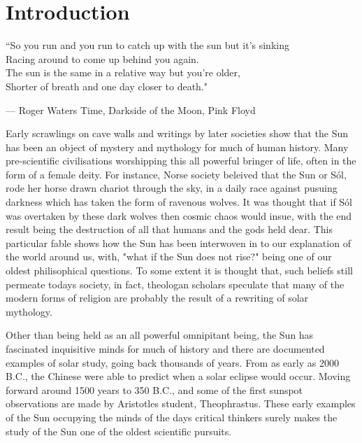 \section{Introduction}

\epigraphfontsize{\small\itshape}
\epigraph{``So you run and you run to catch up with the sun but it's sinking \\
Racing around to come up behind you again. \\
The sun is the same in a relative way but you're older, \\
Shorter of breath and one day closer to death."}{--- \textup{Roger Waters} Time, Darkside of the Moon, Pink Floyd}


Early scrawlings on cave walls and writings by later societies show that the Sun has been an object of mystery and mythology for much of human history. Many pre-scientific civilisations worshipping this all powerful bringer of life, often in the form of a female deity. For instance, Norse society beleived that the Sun or Sól, rode her horse drawn chariot through the sky, in a daily race against pusuing darkness which has taken the form of ravenous wolves. It was thought that if Sól was overtaken by these dark wolves then cosmic chaos would insue, with the end result being the destruction of all that humans and the gods held dear. This particular fable shows how the Sun has been interwoven in to our explanation of the world around us, with, "what if the Sun does not rise?" being one of our oldest philisophical questions. To some extent it is thought that, such beliefs still permeate todays society, in fact, theologan scholars speculate that many of the modern forms of religion are probably the result of a rewriting of solar mythology.  


Other than being held as an all powerful omnipitant being, the Sun has fascinated inquisitive minds for much of history and there are documented examples of solar study, going back thousands of years. From as early as 2000 B.C., the Chinese were able to predict when a solar eclipse would occur. Moving forward around 1500 years to 350 B.C., and some of the first sunspot observations are made by Aristotles student, Theophrastus. These early examples of the Sun occupying the minds of the days critical thinkers surely makes the study of the Sun one of the oldest scientific pursuits.      


